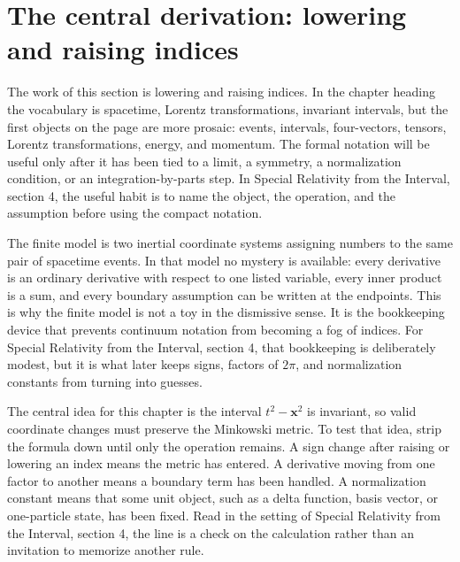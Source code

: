 \section{The central derivation: lowering and raising indices}













The work of this section is lowering and raising indices.  In the chapter heading the vocabulary is spacetime, Lorentz transformations, invariant intervals, but the first objects on the page are more prosaic: events, intervals, four-vectors, tensors, Lorentz transformations, energy, and momentum.  The formal notation will be useful only after it has been tied to a limit, a symmetry, a normalization condition, or an integration-by-parts step.  In Special Relativity from the Interval, section 4, the useful habit is to name the object, the operation, and the assumption before using the compact notation.

The finite model is two inertial coordinate systems assigning numbers to the same pair of spacetime events.  In that model no mystery is available: every derivative is an ordinary derivative with respect to one listed variable, every inner product is a sum, and every boundary assumption can be written at the endpoints.  This is why the finite model is not a toy in the dismissive sense.  It is the bookkeeping device that prevents continuum notation from becoming a fog of indices.  For Special Relativity from the Interval, section 4, that bookkeeping is deliberately modest, but it is what later keeps signs, factors of \(2\pi\), and normalization constants from turning into guesses.

The central idea for this chapter is the interval \(t^2-\bm x^2\) is invariant, so valid coordinate changes must preserve the Minkowski metric.  To test that idea, strip the formula down until only the operation remains.  A sign change after raising or lowering an index means the metric has entered.  A derivative moving from one factor to another means a boundary term has been handled.  A normalization constant means that some unit object, such as a delta function, basis vector, or one-particle state, has been fixed.  Read in the setting of Special Relativity from the Interval, section 4, the line is a check on the calculation rather than an invitation to memorize another rule.


